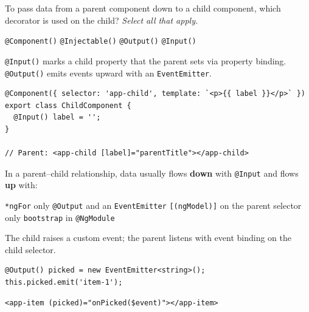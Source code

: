 \question[4]
To pass data from a parent component down to a child component, which decorator is used on the child? \emph{Select all that apply.}
\begin{checkboxes}
  \choice \lstinline[style=tsinline]|@Component()|
  \choice \lstinline[style=tsinline]|@Injectable()|
  \choice \lstinline[style=tsinline]|@Output()|
  \CorrectChoice \lstinline[style=tsinline]|@Input()|
\end{checkboxes}
\begin{solution}
  \lstinline[style=tsinline]|@Input()| marks a child property that the parent sets via property binding. \lstinline[style=tsinline]|@Output()| emits events upward with an \lstinline[style=tsinline]|EventEmitter|.
\begin{lstlisting}[style=ts]
@Component({ selector: 'app-child', template: `<p>{{ label }}</p>` })
export class ChildComponent {
  @Input() label = '';
}

// Parent: <app-child [label]="parentTitle"></app-child>
\end{lstlisting}
\end{solution}



\newpage



\question[4]
In a parent--child relationship, data usually flows \textbf{down} with \lstinline[style=tsinline]|@Input| and flows \textbf{up} with:
\begin{choices}
  \choice \lstinline[style=htmlinline]|*ngFor| only
  \CorrectChoice \lstinline[style=tsinline]|@Output| and an \lstinline[style=tsinline]|EventEmitter|
  \choice \lstinline[style=htmlinline]|[(ngModel)]| on the parent selector only
  \choice \lstinline[style=tsinline]|bootstrap| in \lstinline[style=tsinline]|@NgModule|
\end{choices}
\begin{solution}
  The child raises a custom event; the parent listens with event binding on the child selector.
\begin{lstlisting}[style=ts]
@Output() picked = new EventEmitter<string>();
this.picked.emit('item-1');
\end{lstlisting}
\begin{lstlisting}[style=htmlinline]
<app-item (picked)="onPicked($event)"></app-item>
\end{lstlisting}
\end{solution}




